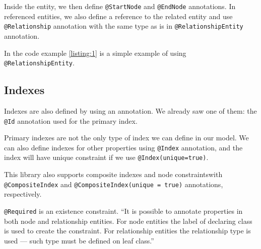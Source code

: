 Inside the entity, we then define \texttt{@StartNode} and \texttt{@EndNode} annotations.
In referenced entities, we also define a reference to the related entity and use \texttt{@Relationship} annotation with the same type as is in \texttt{@RelationshipEntity} annotation.

In the code example \ref{listing:1} is a simple example of using \texttt{@RelationshipEntity}.


\subsection {Indexes}

Indexes are also defined by using an annotation. We already saw one of them: the \texttt{@Id} annotation used for the primary index.

Primary indexes are not the only type of index we can define in our model.
We can also define indexes for other properties using \texttt{@Index} annotation, and the index will have unique constraint if we use \texttt{@Index(unique=true)}.

This library also supports composite indexes and node constraints\linebreak with \texttt{@CompositeIndex} and \texttt{@CompositeIndex(unique = true)} annotations, respectively.

\texttt{@Required} is an existence constraint. ``It is possible to annotate properties in both node and relationship entities.
For node entities the label of declaring class is used to create the constraint.
For relationship entities the relationship type is used --- such type must be defined on leaf class.'' \cite{neo4j_reference_nodate}

